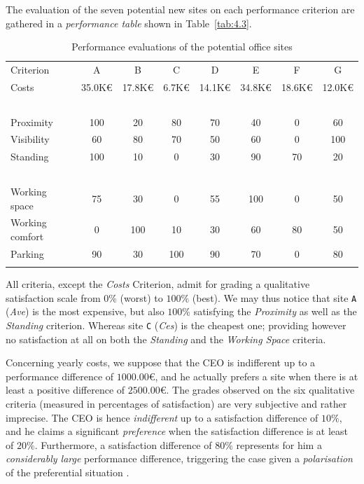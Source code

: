 The evaluation of the seven potential new sites on each performance criterion are gathered in a \emph{performance table} shown in Table~\vref{tab:4.3}.
\begin{table}[h]
\caption{Performance evaluations of the potential office sites}
\label{tab:4.3}       %
\begin{center}
    \begin{tabular}{l|c|c|c|c|c|c|c}
      \svhline\noalign{\smallskip}
    Criterion  &    A  &      B &       C &       D &       E &        F &        G\\
       \noalign{\smallskip}\hline\noalign{\smallskip}

    Costs      &   35.0K€ &  17.8K€  & 6.7K€  &  14.1K€ &  34.8K€ &  18.6K€ &  12.0K€\\
    \          &   \      &  \     &   \     &   \    &    \    &    \    &    \ \\
    Proximity     &   100    &  20 &      80    &   70    &   40    &   0    &    60 \\
    Visibility     &   60     &  80  &     70    &   50    &   60    &   0    &    100 \\
    Standing      &   100   &   10   &    0     &   30    &   90    &   70   &    20 \\
    \           &   \     &   \    &    \     &   \     &   \     &   \    &    \  \\
    Working space      &   75    &   30   &    0     &   55    &   100   &   0    &    50  \\
    Working comfort      &   0     &   100  &    10    &   30    &   60    &   80   &    50 \\
    Parking     &   90    &   30   &    100   &   90    &   70    &   0    &    80 \\
      \noalign{\smallskip}\hline
    \end{tabular}
  \end{center}
\end{table}
All criteria, except the \emph{Costs} Criterion, admit for grading a qualitative satisfaction scale from $0\%$ (worst) to $100\%$ (best). We may thus notice that site \texttt{A} (\emph{Ave}) is the most expensive, but also $100\%$ satisfying the \emph{Proximity} as well as the  \emph{Standing} criterion. Whereas site \texttt{C} (\emph{Ces}) is the cheapest one; providing however no satisfaction at all on both the \emph{Standing} and the \emph{Working Space} criteria.

Concerning yearly costs, we suppose that the CEO is indifferent up to a performance difference of $1000.00$€, and he actually prefers a site when there is at least a positive difference of $2500.00$€. The grades observed on the six qualitative criteria (measured in percentages of satisfaction) are very subjective and rather imprecise. The CEO is hence \emph{indifferent} up to a satisfaction difference of $10\%$, and he claims a significant \emph{preference} when the satisfaction difference is at least of $20\%$.  Furthermore, a satisfaction difference of $80\%$ represents for him a \emph{considerably large} performance difference, triggering the case given a \emph{polarisation} of the preferential situation \citep{BIS-2013}. 

